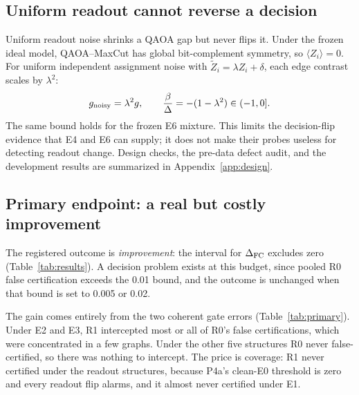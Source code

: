 \documentclass[10pt,twocolumn]{article}
\begin{document}
\subsection{Uniform readout cannot reverse a decision}

Uniform readout noise shrinks a QAOA gap but never flips it. Under the frozen
ideal model, QAOA--MaxCut has global bit-complement symmetry, so
$\langle Z_i\rangle=0$. For uniform independent assignment noise with
$\widetilde Z_i=\lambda Z_i+\delta$, each edge contrast scales by $\lambda^2$:
\begin{equation}
  g_{\rm noisy}=\lambda^2 g,\qquad
  \frac{\beta}{\Delta}=-(1-\lambda^2)\in(-1,0].
  \label{eq:readoutscale}
\end{equation}
The same bound holds for the frozen E6 mixture. This limits the decision-flip
evidence that E4 and E6 can supply; it does not make their probes useless for
detecting readout change. Design checks, the pre-data defect audit, and the
development results are summarized in Appendix~\ref{app:design}.

\subsection{Primary endpoint: a real but costly improvement}

The registered outcome is \emph{improvement}: the interval for $\Delta_{\rm FC}$
excludes zero (Table~\ref{tab:results}). A decision problem exists at this
budget, since pooled R0 false certification exceeds the 0.01 bound, and the
outcome is unchanged when that bound is set to 0.005 or 0.02.

The gain comes entirely from the two coherent gate errors
(Table~\ref{tab:primary}). Under E2 and E3, R1 intercepted most or all of R0's
false certifications, which were concentrated in a few graphs. Under the other
five structures R0 never false-certified, so there was nothing to intercept.
The price is coverage: R1 never certified under the readout structures, because
P4a's clean-E0 threshold is zero and every readout flip alarms, and it almost
never certified under E1.
\end{document}
